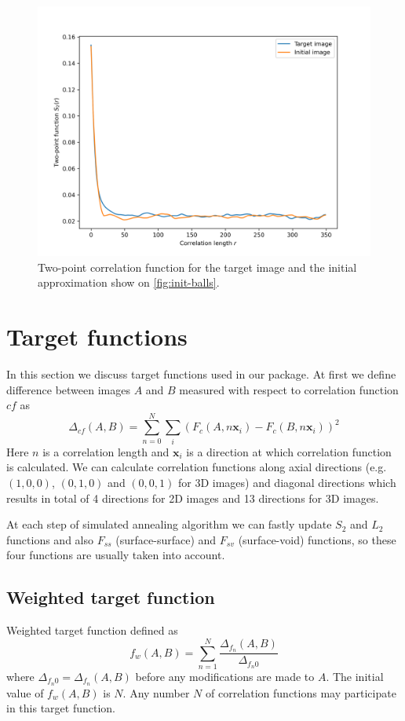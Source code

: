 \documentclass[preprint,amsmath,amssymb,aps,pre]{revtex4-1}
\begin{document}
\begin{figure}[ht]
  \centering
  \includegraphics[width=\linewidth]{../corrfns-plots/init-s2.png}
  \caption[]{Two-point correlation function for the target image and the initial
  approximation show on \cref{fig:init-balls}.}
  \label{fig:init-balls-s2}
\end{figure}

\section{Target functions}
\label{sec:target}
In this section we discuss target functions used in our package. At first we
define difference between images $A$ and $B$ measured with respect to
correlation function $cf$ as
\begin{equation*}
  \Delta_{cf}(A, B) = \sum_{n=0}^{N} \sum_{i} (F_c(A, n\mathbf{x}_i) - F_c(B, n\mathbf{x}_i))^2
\end{equation*}
Here $n$ is a correlation length and $\mathbf{x}_i$ is a direction at which
correlation function is calculated. We can calculate correlation functions along
axial directions (e.g. $(1,0,0)$, $(0, 1, 0)$ and $(0, 0, 1)$ for 3D images) and
diagonal directions which results in total of 4 directions for 2D images and 13
directions for 3D images.

At each step of simulated annealing algorithm we can fastly update $S_2$ and
$L_2$ functions and also $F_{ss}$ (surface-surface) and $F_{sv}$ (surface-void)
functions, so these four functions are usually taken into account.

\subsection{Weighted target function}
\label{sec:target-weighted}
Weighted target function defined as
\begin{equation*}
  f_w(A, B) = \sum_{n=1}^{N} \frac{\Delta_{f_n}(A, B)}{\Delta_{{f_n}0}}
\end{equation*}
where $\Delta_{{f_n}0} = \Delta_{f_n}(A, B)$ before any modifications are made
to $A$. The initial value of $f_w(A, B)$ is $N$. Any number $N$ of correlation
functions may participate in this target function.
\end{document}

